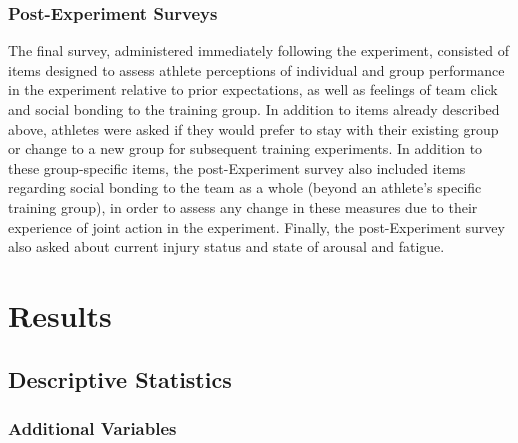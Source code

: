 \subsubsection{\label{app6:surveyItemsPost}Post-Experiment Surveys}
The final survey, administered immediately following the experiment, consisted of items designed to assess athlete perceptions of individual and group performance in the experiment relative to prior expectations, as well as feelings of team click and social bonding to the training group. In addition to items already described above, athletes were asked if they would prefer to stay with their existing group or change to a new group for subsequent training experiments.  In addition to these group-specific items, the post-Experiment survey also included items regarding social bonding to the team as a whole (beyond an athlete's specific training group), in order to assess any change in these measures due to their experience of joint action in the experiment.  Finally, the post-Experiment survey also asked about current injury status and state of arousal and fatigue.



\section{\label{app6:results}Results}

\subsection{Descriptive Statistics\label{app6:descriptives}}














\subsubsection{Additional Variables\label{app6:additionalVariables}}

